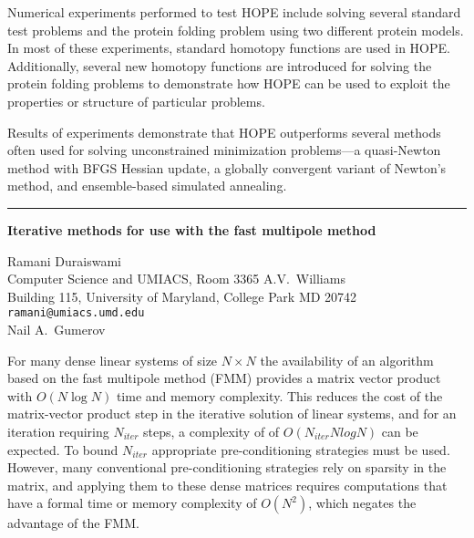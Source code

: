 \documentclass[twosided]{report}
\begin{document}
Numerical experiments performed to test HOPE include solving
several standard test problems and the protein folding
problem using two different protein models. In most of these
experiments, standard homotopy functions are used in HOPE.
Additionally, several new homotopy functions are introduced
for solving the protein folding problems to demonstrate how
HOPE can be used to exploit the properties or structure of
particular problems.

Results of experiments demonstrate
that HOPE outperforms several methods often used for solving
unconstrained minimization problems---a quasi-Newton method
with BFGS Hessian update, a globally convergent variant of
Newton's method, and ensemble-based simulated annealing.



	\begin{center} \rule{6in}{1pt} \end{center}

\begin{center}
{\large			%
{\bf Iterative methods for use with the fast multipole method}}

	Ramani Duraiswami \\
	Computer Science and UMIACS, Room 3365 A.V.~Williams \\
	Building 115, University of Maryland, College Park MD 20742 \\
	{\tt ramani@umiacs.umd.edu} \\
	Nail A.~Gumerov
\end{center}
For many dense linear systems of size $N\times N$ the
availability of an algorithm based on the fast multipole
method (FMM) provides a matrix vector product with
$O(N \log N)$
time and memory complexity. This reduces the cost of the
matrix-vector product step in the iterative solution of
linear systems, and for an iteration requiring $N_{iter}$
steps, a complexity of of $O(N_{iter}NlogN)$ can be
expected. To bound $N_{iter}$ appropriate pre-conditioning
strategies must be used. However, many conventional
pre-conditioning strategies rely on sparsity in the matrix,
and applying them to these dense matrices requires
computations that have a formal time or memory complexity of
$O(N^2)$, which negates the advantage of the FMM.
\end{document}
